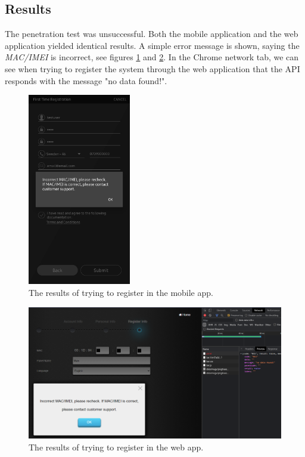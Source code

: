 \subsection{Results}
The penetration test was unsuccessful. Both the mobile application and the web application yielded identical results. A simple error message is shown, saying the \textit{MAC/IMEI} is incorrect, see figures \ref{fig:vesta-home-registration-failed} and \ref{fig:vesta-web-registration-failed}. In the Chrome network tab, we can see when trying to register the system through the web application that the API responds with the message "no data found!".
\begin{figure}[!ht]
    \centering
    \includegraphics[width=0.4\textwidth]{images/6-pentesting/vesta-home-registration-failed.jpg}
    \caption{The results of trying to register in the mobile app.}
    \label{fig:vesta-home-registration-failed}
\end{figure}
\begin{figure}[!ht]
    \centering
    \includegraphics[width=\textwidth]{images/6-pentesting/vesta-web-registration-failed.png}
    \caption{The results of trying to register in the web app.}
    \label{fig:vesta-web-registration-failed}
\end{figure}

